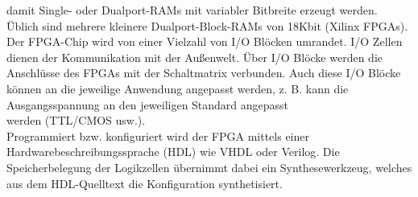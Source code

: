 damit Single- oder Dualport-RAMs mit variabler Bitbreite
erzeugt werden. Üblich sind mehrere kleinere 
Dualport-Block-RAMs von 18Kbit (Xilinx FPGAs).\\ 
Der FPGA-Chip wird von
einer Vielzahl von I/O Blöcken umrandet. I/O Zellen dienen der
Kommunikation mit der Außenwelt. Über I/O Blöcke werden
die Anschlüsse des FPGAs mit der Schaltmatrix verbunden.
Auch diese I/O Blöcke können an die jeweilige Anwendung
angepasst werden, z. B. kann die Ausgangsspannung an
den jeweiligen Standard angepasst \\werden (TTL/CMOS usw.).\\
Programmiert bzw. konfiguriert wird der FPGA mittels
einer Hardwarebeschreibungssprache (HDL) wie VHDL oder Verilog. 
Die Speicherbelegung der Logikzellen übernimmt dabei ein
Synthesewerkzeug, welches aus dem HDL-Quelltext die
Konfiguration synthetisiert.


